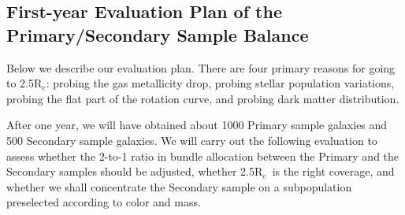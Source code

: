 \documentclass[preprint,11pt]{aastex}
\newcommand{\Reff}{{R$_{e}$}}
\begin{document}


\subsection{First-year Evaluation Plan of the Primary/Secondary Sample Balance}

Below we describe our evaluation plan. There are four primary reasons
for going to 2.5\Reff: probing the gas metallicity drop, probing
stellar population variations, probing the flat part of the rotation
curve, and probing dark matter distribution. 

After one year, we will have obtained about 1000 Primary sample
galaxies and 500 Secondary sample galaxies. We will carry out the
following evaluation to assess whether the 2-to-1 ratio in bundle
allocation between the Primary and the Secondary samples should be
adjusted, whether 2.5\Reff\ is the right coverage, and whether we shall
concentrate the Secondary sample on a subpopulation preselected
according to color and mass.
\end{document}
